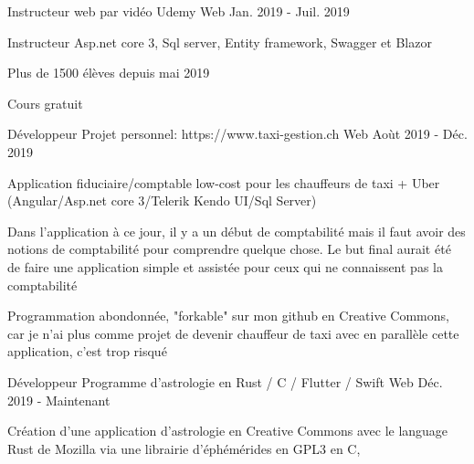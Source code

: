 

\begin{cventries}

  \cventry
    {Instructeur web par vidéo} %
    {Udemy} %
    {Web} %
    {Jan. 2019 - Juil. 2019} %
    {
      \begin{cvitems} %
        \item {Instructeur Asp.net core 3, Sql server, Entity framework, Swagger et Blazor}
        \item {Plus de 1500 élèves depuis mai 2019}
        \item {Cours gratuit}
      \end{cvitems}
    }

  \cventry
    {Développeur} %
    {Projet personnel: https://www.taxi-gestion.ch} %
    {Web} %
    {Aoùt 2019 - Déc. 2019} %
    {
      \begin{cvitems} %
        \item {Application fiduciaire/comptable low-cost pour les chauffeurs de taxi + Uber (Angular/Asp.net core 3/Telerik Kendo UI/Sql Server)}
        \item {Dans l'application à ce jour, il y a un début de comptabilité mais il faut avoir des notions de comptabilité pour comprendre quelque chose. Le but final aurait été de faire une application simple et assistée pour ceux qui ne connaissent pas la comptabilité}
        \item {Programmation abondonnée, "forkable" sur mon github en Creative Commons, car je n'ai plus comme projet de devenir chauffeur de taxi avec en parallèle cette application, c'est trop risqué}
      \end{cvitems}
    }

  \cventry
    {Développeur} %
    {Programme d'astrologie en Rust / C / Flutter / Swift} %
    {Web} %
    {Déc. 2019 - Maintenant} %
    {
      \begin{cvitems} %
        \item {Création d'une application d'astrologie en Creative Commons avec le language Rust de Mozilla via une librairie d'éphémérides en GPL3 en C},
      \end{cvitems}
    }

\end{cventries}
